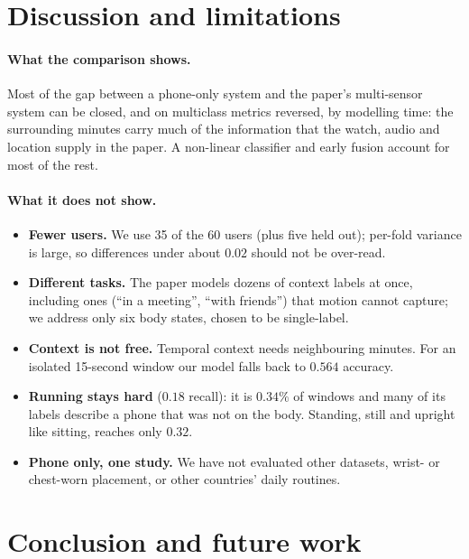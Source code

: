 \documentclass[11pt,a4paper]{article}
\begin{document}
\section{Discussion and limitations}

\paragraph{What the comparison shows.}
Most of the gap between a phone-only system and the paper's multi-sensor system can be
closed, and on multiclass metrics reversed, by modelling time: the surrounding minutes
carry much of the information that the watch, audio and location supply in the paper. A
non-linear classifier and early fusion account for most of the rest.

\paragraph{What it does not show.}
\begin{itemize}
\item \textbf{Fewer users.} We use 35 of the 60 users (plus five held out); per-fold
variance is large, so differences under about $0.02$ should not be over-read.
\item \textbf{Different tasks.} The paper models dozens of context labels at once,
including ones (``in a meeting'', ``with friends'') that motion cannot capture; we
address only six body states, chosen to be single-label.
\item \textbf{Context is not free.} Temporal context needs neighbouring minutes. For an
isolated 15-second window our model falls back to $0.564$ accuracy.
\item \textbf{Running stays hard} ($0.18$ recall): it is $0.34\%$ of windows and many of its
labels describe a phone that was not on the body. Standing, still and upright like
sitting, reaches only $0.32$.
\item \textbf{Phone only, one study.} We have not evaluated other datasets, wrist- or
chest-worn placement, or other countries' daily routines.
\end{itemize}

\section{Conclusion and future work}
\end{document}
